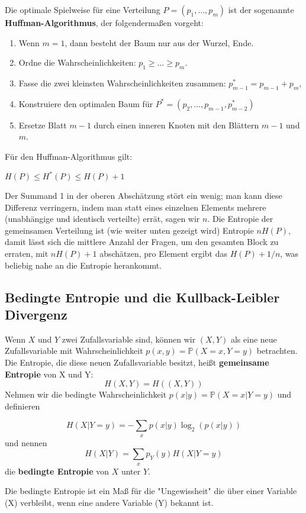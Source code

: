 \begin{definition}\label{def:huffman_algorithmus}
Die optimale Spielweise für eine Verteilung $P=(p_1,\dots, p_m)$ ist der sogenannte \textbf{Huffman-Algorithmus}, der folgendermaßen vorgeht:

\begin{enumerate}
\item Wenn $m=1$, dann besteht der Baum nur aus der Wurzel, Ende.
\item Ordne die Wahrscheinlichkeiten: $p_1\ge\dots\ge p_m$.
\item Fasse die zwei kleinsten Wahrscheinlichkeiten zusammen: 
$p^*_{m-1}=p_{m-1}+p_m$,
\item Konstruiere den optimalen Baum für $P^*=(p_2,\dots,p_{m-1},p_{m-2}^*)$
\item Ersetze Blatt $m-1$ durch einen inneren Knoten mit den Blättern
$m-1$ und $m$.
\end{enumerate}
\end{definition}
Für den Huffman-Algorithmus gilt:
\begin{satz} %
$H(P) \leq H^*(P) \leq H(P) +1$
\end{satz}

Der Summand 1 in der oberen Abschätzung stört ein wenig; man kann
diese Differenz verringern, indem man statt eines einzelnen
Elements mehrere (unabhängige und identisch verteilte) errät, sagen wir $n$.
Die Entropie der gemeinsamen Verteilung ist (wie weiter unten
gezeigt wird) Entropie $nH(P)$, damit lässt sich die mittlere Anzahl der
Fragen, um den gesamten Block zu erraten, mit $nH(P)+1$
abschätzen, pro Element ergibt das $H(P)+1/n$, was beliebig nahe an
die Entropie herankommt.

\ifdefined\uebsps
\newExercPage


\fi

\subsection{Bedingte Entropie und die Kullback-Leibler Divergenz}
Wenn $X$ und $Y$ zwei Zufallsvariable sind, können wir $(X,Y)$
als eine neue Zufallsvariable mit Wahrscheinlichkeit $p(x, y)=\mathbb P(X=x, Y=y)$ betrachten.\\
Die Entropie, die diese neuen Zufallsvariable besitzt, heißt  \textbf{gemeinsame Entropie} von X und Y:\\
 \[H(X,Y)=H((X,Y))\]
Nehmen wir die bedingte Wahrscheinlichkeit
$p(x|y)=\mathbb P(X=x|Y=y)$ und definieren
\begin{definition}
\[H(X|Y=y)=-\sum_x p(x|y)\log_2(p(x|y))\]
und nennen
\[H(X|Y)=\sum_x p_Y(y)H(X|Y=y)\]
die \textbf{bedingte Entropie} von $X$ unter $Y$.
\end{definition}
Die bedingte Entropie ist ein Maß für die "Ungewissheit" die über einer Variable (X) verbleibt, wenn eine andere Variable (Y) bekannt ist.\\

